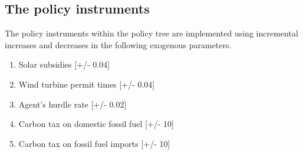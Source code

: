 

\subsection{The policy instruments}
\label{ssec:interfaceInstruments}

The policy instruments within the policy tree are implemented using incremental increases and decreases in the following exogenous parameters.

\begin{enumerate}
\item Solar subsidies [+/- 0.04]
\item Wind turbine permit times [+/- 0.04]
\item Agent's hurdle rate  [+/- 0.02]
\item Carbon tax on domestic fossil fuel [+/- 10]
\item Carbon tax on fossil fuel imports [+/- 10]
\end{enumerate}

